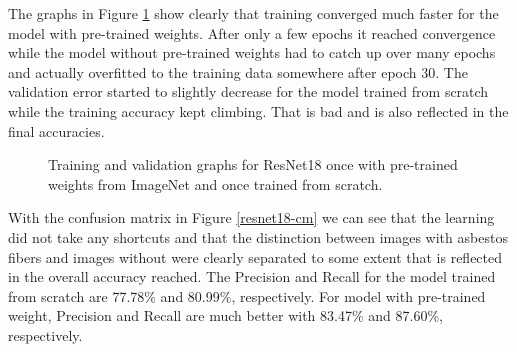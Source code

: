 The graphs in Figure \ref{fig:resnet18-graph} show clearly that training converged much faster for the model with pre-trained weights. After only a few epochs it reached convergence while the model without pre-trained weights had to catch up over many epochs and actually overfitted to the training data somewhere after epoch 30. The validation error started to slightly decrease for the model trained from scratch while the training accuracy kept climbing. That is bad and is also reflected in the final accuracies.

\begin{figure}[h]
\centering
{}
\caption{Training and validation graphs for ResNet18 once with pre-trained weights from ImageNet and once trained from scratch.}
\label{fig:resnet18-graph}
\end{figure}

With the confusion matrix in Figure \ref{resnet18-cm} we can see that the learning did not take any shortcuts and that the distinction between images with asbestos fibers and images without were clearly separated to some extent that is reflected in the overall accuracy reached. The Precision and Recall for the model trained from scratch are 77.78\% and 80.99\%, respectively. For model with pre-trained weight, Precision and Recall are much better with 83.47\% and 87.60\%, respectively.

